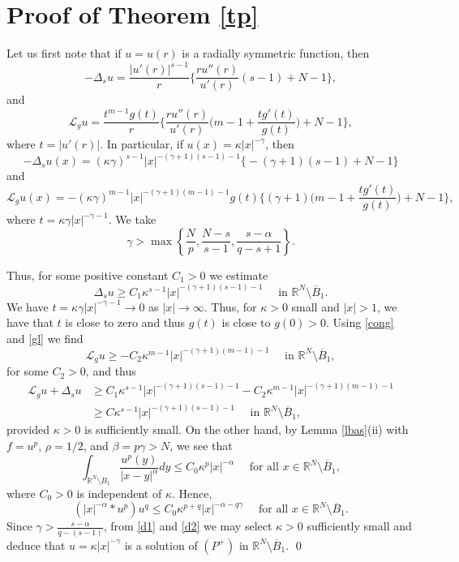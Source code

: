 \documentclass[leqno,12pt]{article}
\numberwithin{equation}{section}
\newcommand{\R}{\mathbb R}
\newcommand{\Ro}{\mathbb R^N\setminus \overline B_1}
\newcommand{\Lg}{{\mathcal L}_g}
\begin{document}
\section{Proof of Theorem \ref{tp}}

Let us first note that if $u=u(r)$ is a radially symmetric function, then
\begin{equation}\label{sv}
-\Delta_s u=\frac{|u'(r)|^{s-1}}{r}\Big\{\frac{ru''(r)}{u'(r)}(s-1)+N-1\Big\},
\end{equation}
and 
\begin{equation}\label{gv}
\Lg u=\frac{t^{m-1}g(t)}{r}\Big\{\frac{ru''(r)}{u'(r)}\Big(m-1+\frac{tg'(t)}{g(t)}\Big)+N-1\Big\},
\end{equation}
where $t=|u'(r)|$. In particular, if $u(x)=\kappa |x|^{-\gamma}$, then 
\begin{equation}\label{sl}
-\Delta_s u(x)=(\kappa \gamma)^{s-1}|x|^{-(\gamma+1)(s-1)-1}\big\{-(\gamma+1)(s-1)+N-1\big\}
\end{equation}
and
\begin{equation}\label{gl}
\Lg u(x)=-(\kappa \gamma)^{m-1}|x|^{-(\gamma+1)(m-1)-1}g(t)\Big\{(\gamma+1)\Big(m-1+\frac{tg'(t)}{g(t)}\Big)+N-1\Big\},
\end{equation}
where $t=\kappa \gamma|x|^{-\gamma-1}$. We take
$$
\gamma>\max\left\{\frac{N}{p}, \frac{N-s}{s-1}, \frac{s-\alpha}{q-s+1}  \right\}.
$$



Thus, for some positive constant $C_1>0$ we estimate
$$
\Delta_s u\geq C_1\kappa^{s-1} |x|^{-(\gamma+1)(s-1)-1}\quad\mbox{ in }\Ro.
$$
We have $t=\kappa \gamma|x|^{-\gamma-1}\to 0$ as $|x|\to \infty$. Thus, for $\kappa>0$ small and $|x|>1$, we have that $t$ is close to zero and thus $g(t)$ is close to $g(0)>0$. Using \eqref{cong} and \eqref{gl} we find
$$
\Lg u\geq -C_2 \kappa^{m-1} |x|^{-(\gamma+1)(m-1)-1} \quad\mbox{ in }\Ro,
$$
for some $C_2>0$, and thus
\begin{equation}\label{d1}
\begin{aligned}
\Lg u+\Delta_s u &\geq C_1\kappa^{s-1} |x|^{-(\gamma+1)(s-1)-1}-C_2 \kappa^{m-1} |x|^{-(\gamma+1)(m-1)-1}\\
&\geq C \kappa^{s-1} |x|^{-(\gamma+1)(s-1)-1} \quad\mbox{ in }\Ro,
\end{aligned}
\end{equation}
provided $\kappa>0$ is sufficiently small. On the other hand, by 
Lemma \ref{lbas}(ii) with $f=u^p$, $\rho=1/2$, and $\beta=p\gamma>N$, we see that
$$
\int_{\R^N\setminus B_1}\frac{u^p(y)}{|x-y|^\alpha} dy\leq C_0\kappa^p |x|^{-\alpha}\quad\mbox{ for all }x\in \Ro,
$$
where $C_0>0$ is independent of $\kappa$.
Hence,
\begin{equation}\label{d2}
(|x|^{-\alpha}*u^p)u^q\leq C_0\kappa^{p+q} |x|^{-\alpha-q\gamma} \quad\mbox{ for all }x\in \Ro.
\end{equation}
Since $\gamma>\frac{s-\alpha}{q-(s-1)}$, from \eqref{d1} and \eqref{d2} we may select $\kappa>0$ sufficiently small and deduce that $u=\kappa|x|^{-\gamma}$ is a solution of $(P^+)$ in $\Ro$. 
\qed
\end{document}

